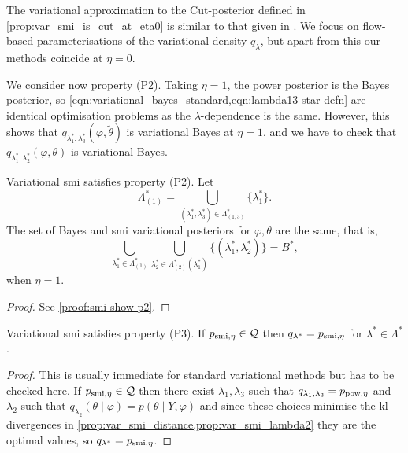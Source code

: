 The variational approximation to the Cut-posterior defined in \cref{prop:var_smi_is_cut_at_eta0} is similar to that given in \cite{Yu2021variationalcut}.
We focus on flow-based parameterisations of the variational density $q_\lambda$, but apart from this our methods coincide at $\eta=0$.

We consider now property (P2).
Taking $\eta=1$, the power posterior is the Bayes posterior, so \cref{eqn:variational_bayes_standard,eqn:lambda13-star-defn} are identical optimisation problems as the $\lambda$-dependence is the same.
However, this shows that $q_{\lambda^*_1,\lambda^*_3}(\varphi,\tilde\theta)$ is variational Bayes at $\eta=1$, and we have to check that $q_{\lambda^*_1,\lambda^*_2}(\varphi,\theta)$ is variational Bayes.

\begin{proposition} \label{prop:smi-show-p2}
  Variational \acrshort*{smi} satisfies property (P2). Let
  \[
    \Lambda^*_{(1)}=\bigcup_{(\lambda^*_1,\lambda^*_3)\in \Lambda^*_{(1,3)}} \{\lambda_1^*\}.
  \]
  The set of Bayes and \acrshort*{smi} variational posteriors for $\varphi,\theta$ are the same, that is,
  \[
    \bigcup_{\lambda_1^*\in\Lambda^*_{(1)}}\bigcup_{\lambda^*_2\in \Lambda_{(2)}^*(\lambda^*_1)} \{(\lambda^*_1,\lambda^*_2)\}=B^*,
  \]
  when $\eta=1$.
\end{proposition}
\begin{proof}
  See \cref{proof:smi-show-p2}.
\end{proof}

\begin{proposition} \label{prop:smi-show-p3}
  Variational \acrshort*{smi} satisfies property (P3).
  If $p_{ \operatorname{\text{smi}}, \eta}\in\mathcal{Q}$ then $q_{\lambda^*}=p_{ \operatorname{\text{smi}}, \eta}$ for $\lambda^*\in \Lambda^*$.
\end{proposition}
\begin{proof}\label{proof:smi-show-p3}
  This is usually immediate for standard variational methods but has to be checked here. If $p_{\operatorname{\text{smi}}, \eta}\in\mathcal{Q}$ then there exist $\lambda_1,\lambda_3$ such that  $q_{\lambda_1,\lambda_3}=p_{\operatorname{\text{pow}}, \eta}$ and $\lambda_2$ such that $q_{\lambda_2}(\theta\mid \varphi)=p(\theta \mid Y,\varphi)$ and since these choices minimise the \acrshort*{kl}-divergences in \cref{prop:var_smi_distance,prop:var_smi_lambda2} they are the optimal values, so $q_{\lambda^*}=p_{\operatorname{\text{smi}}, \eta}$.
\end{proof}


